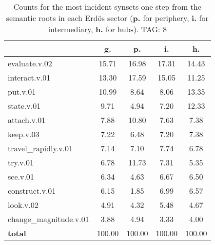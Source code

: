 \begin{table}[h!]
\begin{center}
\begin{tabular}{| l | c | c | c | c |}\hline
 & g. & p. & i. & h. \\\hline
evaluate.v.02 & 15.71  & 16.98  & 17.31  & 14.43 \\\hline
interact.v.01 & 13.30  & 17.59  & 15.05  & 11.25 \\\hline
put.v.01 & 10.99  & 8.64  & 8.06  & 13.35 \\\hline
state.v.01 & 9.71  & 4.94  & 7.20  & 12.33 \\\hline
attach.v.01 & 7.88  & 10.80  & 7.63  & 7.38 \\\hline
keep.v.03 & 7.22  & 6.48  & 7.20  & 7.38 \\\hline
travel\_rapidly.v.01 & 7.14  & 7.10  & 7.74  & 6.78 \\\hline
try.v.01 & 6.78  & 11.73  & 7.31  & 5.35 \\\hline
see.v.01 & 6.34  & 4.63  & 6.67  & 6.50 \\\hline
construct.v.01 & 6.15  & 1.85  & 6.99  & 6.57 \\\hline
look.v.02 & 4.91  & 4.32  & 5.48  & 4.67 \\\hline
change\_magnitude.v.01 & 3.88  & 4.94  & 3.33  & 4.00 \\\hline
{{\bf total}} & 100.00  & 100.00  & 100.00  & 100.00 \\\hline
\end{tabular}
\caption{Counts for the most incident synsets one step from the semantic roots in each Erd\"os sector ({\bf p.} for periphery, {\bf i.} for intermediary, {\bf h.} for hubs). TAG: 8}
\end{center}
\end{table}